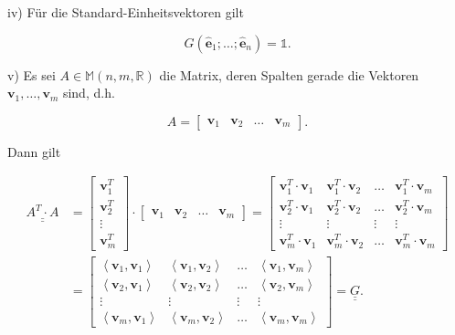 \documentclass[10pt]{article}
\begin{document}
iv) Für die Standard-Einheitsvektoren gilt


\begin{equation*}
G\left(\hat{\mathbf{e}}_{1} ; \ldots ; \hat{\mathbf{e}}_{n}\right)=\mathbb{1} . \tag{6.137}
\end{equation*}


v) Es sei $A \in \mathbb{M}(n, m, \mathbb{R})$ die Matrix, deren Spalten gerade die Vektoren $\mathbf{v}_{1}, \ldots, \mathbf{v}_{m}$ sind, d.h.

\[
A=\left[\begin{array}{llll}
\mathbf{v}_{1} & \mathbf{v}_{2} & \ldots & \mathbf{v}_{m} \tag{6.138}
\end{array}\right] .
\]

Dann gilt


\begin{align*}
\underline{\underline{A^{T} \cdot A}} & =\left[\begin{array}{c}
\mathbf{v}_{1}^{T} \\
\mathbf{v}_{2}^{T} \\
\vdots \\
\mathbf{v}_{m}^{T}
\end{array}\right] \cdot\left[\begin{array}{llll}
\mathbf{v}_{1} & \mathbf{v}_{2} & \ldots & \mathbf{v}_{m}
\end{array}\right]=\left[\begin{array}{ccccc}
\mathbf{v}_{1}^{T} \cdot \mathbf{v}_{1} & \mathbf{v}_{1}^{T} \cdot \mathbf{v}_{2} & \ldots & \mathbf{v}_{1}^{T} \cdot \mathbf{v}_{m} \\
\mathbf{v}_{2}^{T} \cdot \mathbf{v}_{1} & \mathbf{v}_{2}^{T} \cdot \mathbf{v}_{2} & \ldots & \mathbf{v}_{2}^{T} \cdot \mathbf{v}_{m} \\
\vdots & \vdots & \vdots & \vdots \\
\mathbf{v}_{m}^{T} \cdot \mathbf{v}_{1} & \mathbf{v}_{m}^{T} \cdot \mathbf{v}_{2} & \ldots & \mathbf{v}_{m}^{T} \cdot \mathbf{v}_{m}
\end{array}\right] \\
& =\left[\begin{array}{cccc}
\left\langle\mathbf{v}_{1}, \mathbf{v}_{1}\right\rangle & \left\langle\mathbf{v}_{1}, \mathbf{v}_{2}\right\rangle & \ldots & \left\langle\mathbf{v}_{1}, \mathbf{v}_{m}\right\rangle \\
\left\langle\mathbf{v}_{2}, \mathbf{v}_{1}\right\rangle & \left\langle\mathbf{v}_{2}, \mathbf{v}_{2}\right\rangle & \ldots & \left\langle\mathbf{v}_{2}, \mathbf{v}_{m}\right\rangle \\
\vdots & \vdots & \vdots & \vdots \\
\left\langle\mathbf{v}_{m}, \mathbf{v}_{1}\right\rangle & \left\langle\mathbf{v}_{m}, \mathbf{v}_{2}\right\rangle & \ldots & \left\langle\mathbf{v}_{m}, \mathbf{v}_{m}\right\rangle
\end{array}\right]=\underline{\underline{G}} . \tag{6.139}
\end{align*}
\end{document}
